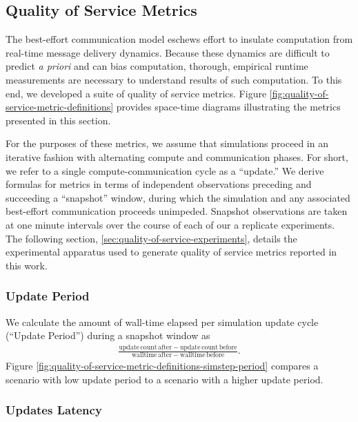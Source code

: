 \subsection{Quality of Service Metrics} \label{sec:quality-of-service-metrics}



The best-effort communication model eschews effort to insulate computation from real-time message delivery dynamics.
Because these dynamics are difficult to predict \textit{a priori} and can bias computation, thorough, empirical runtime measurements are necessary to understand results of such computation.
To this end, we developed a suite of quality of service metrics.
Figure \ref{fig:quality-of-service-metric-definitions} provides space-time diagrams illustrating the metrics presented in this section.

For the purposes of these metrics, we assume that simulations proceed in an iterative fashion with alternating compute and communication phases.
For short, we refer to a single compute-communication cycle as a ``update.''
We derive formulas for metrics in terms of independent observations preceding and succeeding a ``snapshot'' window, during which the simulation and any associated best-effort communication proceeds unimpeded.
Snapshot observations are taken at one minute intervals over the course of each of our a replicate experiments.
The following section, \ref{sec:quality-of-service-experiments}, details the experimental apparatus used to generate quality of service metrics reported in this work.

\subsubsection{Update Period} \label{sec:simstep-period-metric}

We calculate the amount of wall-time elapsed per simulation update cycle (``Update Period'') during a snapshot window as
\begin{align*}
\frac{
  \mathrm{update\,count\,after} - \mathrm{update\,count\,before}
}{
  \mathrm{walltime\,after} - \mathrm{walltime\,before}
}.
\end{align*}
Figure \ref{fig:quality-of-service-metric-definitions-simstep-period} compares a scenario with low update period to a scenario with a higher update period.

\subsubsection{Updates Latency} \label{sec:wall-time-latency-metric}

